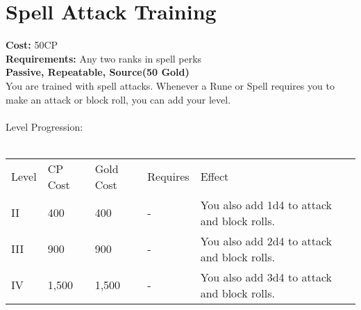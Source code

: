 \section{Spell Attack Training}\label{perk:spellAttackTraining}
\textbf{Cost:} 50CP\\
\textbf{Requirements:} Any two ranks in spell perks\\
\textbf{Passive, Repeatable, Source(50 Gold)}\\
You are trained with spell attacks.
Whenever a Rune or Spell requires you to make an attack or block roll, you can add your level.\\
\\
Level Progression:\\
\\
\begin{tabular}{l | l | l | l | l}
	Level & CP Cost & Gold Cost & Requires & Effect\\
	II & 400 & 400 & - & You also add 1d4 to attack and block rolls.\\
	III & 900 & 900 & - & You also add 2d4 to attack and block rolls.\\
	IV & 1,500 & 1,500 & - & You also add 3d4 to attack and block rolls.\\
\end{tabular}